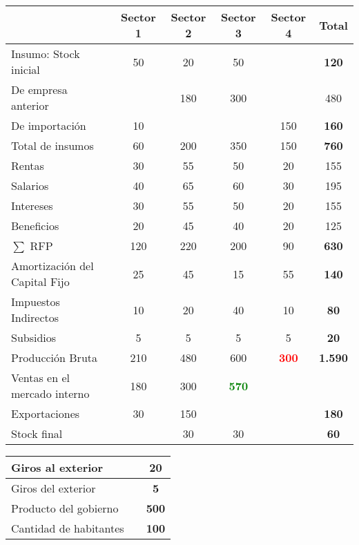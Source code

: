 \documentclass[12pt,a4paper]{article}
\begin{document}
        \begin{table}[H]
		\centering
        	\begin{tabular}{ || l | c | c | c | c | c || }
				\hline
                & Sector 1 & Sector 2 & Sector 3 & Sector 4 & Total \\ \hline
				Insumo: Stock inicial			& 50  & 20  & 50  &     & \textbf{120} \\ \hline
                De empresa anterior				&     & 180 & 300 &     & 480 \\ \hline
                De importación					& 10  &     &     & 150 & \textbf{160} \\ \hline \hline
                Total de insumos				& 60  & 200 & 350 & 150 & \textbf{760} \\ \hline \hline
                Rentas							& 30  & 55  & 50  & 20  & 155 \\ \hline
                Salarios						& 40  & 65  & 60  & 30  & 195 \\ \hline
                Intereses						& 30  & 55  & 50  & 20  & 155 \\ \hline
                Beneficios						& 20  & 45  & 40  & 20  & 125 \\ \hline \hline
                $\sum$ RFP						& 120 & 220 & 200 & 90  & \textbf{630} \\ \hline \hline
                Amortización del Capital Fijo	& 25  & 45  & 15  & 55  & \textbf{140} \\ \hline
                Impuestos Indirectos			& 10  & 20  & 40  & 10  & \textbf{80}  \\ \hline
                Subsidios						& 5   & 5   & 5   & 5   & \textbf{20}  \\ \hline \hline
                Producción Bruta				& 210 & 480 & 600 & \textcolor{red}{\textbf{300}} & \textbf{1.590} \\ \hline \hline
                Ventas en el mercado interno	& 180 & 300 & \textcolor{green}{\textbf{570}} &     &  \\ \hline
                Exportaciones					& 30  & 150 &     &     & \textbf{180} \\ \hline
                Stock final						&     & 30  & 30  &     & \textbf{60} \\ \hline
			\end{tabular}
		\end{table}
        
        \begin{table}[H]
		\centering
        	\begin{tabular}{ || l p{8.7cm} c || }
            	\hline
				Giros al exterior && \textbf{20} \\ \hline
                Giros del exterior && \textbf{5} \\ \hline
                Producto del gobierno && \textbf{500} \\ \hline
                Cantidad de habitantes && \textbf{100} \\ \hline
			\end{tabular}
		\end{table}
        
\end{document}
